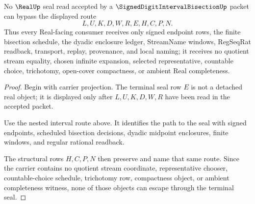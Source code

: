 \begin{theorem}
\label{thm:signed-digit-interval-bisection-real-seal-nonescape}
No $\RealUp$ seal read accepted by a $\SignedDigitIntervalBisectionUp$ packet can bypass the displayed route
$$
L,U,K,D,W,R,E,H,C,P,N .
$$
Thus every Real-facing consumer receives only signed endpoint rows, the finite bisection schedule, the dyadic enclosure ledger, StreamName windows, RegSeqRat readback, transport, replay, provenance, and local naming; it receives no quotient stream equality, chosen infinite expansion, selected representative, countable choice, trichotomy, open-cover compactness, or ambient Real completeness.
\end{theorem}
\begin{proof}
Begin with carrier projection. The terminal seal row $E$ is not a detached real object; it is displayed only after $L,U,K,D,W,R$ have been read in the accepted packet.

Use the nested interval route above. It identifies the path to the seal with signed endpoints, scheduled bisection decisions, dyadic midpoint enclosures, finite windows, and regular rational readback.

The structural rows $H,C,P,N$ then preserve and name that same route. Since the carrier contains no quotient stream coordinate, representative chooser, countable-choice schedule, trichotomy row, compactness object, or ambient completeness witness, none of those objects can escape through the terminal seal.
\end{proof}


\begin{closurestatus}{\SignedDigitIntervalBisectionUp}
  \theoryclosure{\seedClosure}
  \formalstatus{\unformalizedV}
\end{closurestatus}
